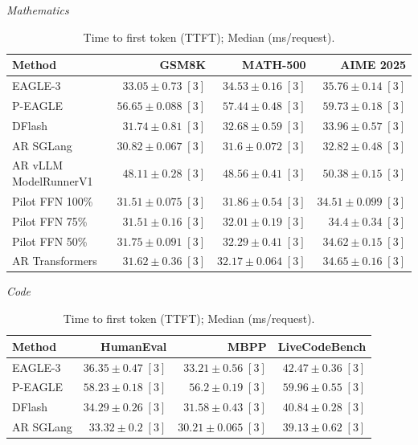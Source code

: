 \begin{table}[!htp]
\centering\small
\setlength{\tabcolsep}{3pt}
\caption{Time to first token (TTFT); Median (ms/request).}
\label{tab:appendix-metric-ttft-median-none}
\textit{Mathematics}\par\smallskip
\begin{tabular}{@{}>{\raggedright\arraybackslash}p{3.7cm}rrr@{}}
\toprule
Method & GSM8K & MATH-500 & AIME 2025 \\
\midrule
EAGLE-3 & \(33.05 \pm 0.73\;[3]\) & \(34.53 \pm 0.16\;[3]\) & \(35.76 \pm 0.14\;[3]\) \\
P-EAGLE & \(56.65 \pm 0.088\;[3]\) & \(57.44 \pm 0.48\;[3]\) & \(59.73 \pm 0.18\;[3]\) \\
DFlash & \(31.74 \pm 0.81\;[3]\) & \(32.68 \pm 0.59\;[3]\) & \(33.96 \pm 0.57\;[3]\) \\
AR \textperiodcentered{} SGLang & \(\mathbf{30.82} \pm 0.067\;[3]\) & \(\mathbf{31.6} \pm 0.072\;[3]\) & \(\mathbf{32.82} \pm 0.48\;[3]\) \\
AR \textperiodcentered{} vLLM ModelRunnerV1 & \(48.11 \pm 0.28\;[3]\) & \(48.56 \pm 0.41\;[3]\) & \(50.38 \pm 0.15\;[3]\) \\
Pilot FFN 100\% & \(31.51 \pm 0.075\;[3]\) & \(31.86 \pm 0.54\;[3]\) & \(34.51 \pm 0.099\;[3]\) \\
Pilot FFN 75\% & \(31.51 \pm 0.16\;[3]\) & \(32.01 \pm 0.19\;[3]\) & \(34.4 \pm 0.34\;[3]\) \\
Pilot FFN 50\% & \(31.75 \pm 0.091\;[3]\) & \(32.29 \pm 0.41\;[3]\) & \(34.62 \pm 0.15\;[3]\) \\
AR \textperiodcentered{} Transformers & \(31.62 \pm 0.36\;[3]\) & \(32.17 \pm 0.064\;[3]\) & \(34.65 \pm 0.16\;[3]\) \\
\bottomrule
\end{tabular}\par\medskip
\textit{Code}\par\smallskip
\begin{tabular}{@{}>{\raggedright\arraybackslash}p{3.7cm}rrr@{}}
\toprule
Method & HumanEval & MBPP & LiveCodeBench \\
\midrule
EAGLE-3 & \(36.35 \pm 0.47\;[3]\) & \(33.21 \pm 0.56\;[3]\) & \(42.47 \pm 0.36\;[3]\) \\
P-EAGLE & \(58.23 \pm 0.18\;[3]\) & \(56.2 \pm 0.19\;[3]\) & \(59.96 \pm 0.55\;[3]\) \\
DFlash & \(34.29 \pm 0.26\;[3]\) & \(31.58 \pm 0.43\;[3]\) & \(40.84 \pm 0.28\;[3]\) \\
AR \textperiodcentered{} SGLang & \(\mathbf{33.32} \pm 0.2\;[3]\) & \(\mathbf{30.21} \pm 0.065\;[3]\) & \(\mathbf{39.13} \pm 0.62\;[3]\) \\

\end{tabular}
\end{table}
